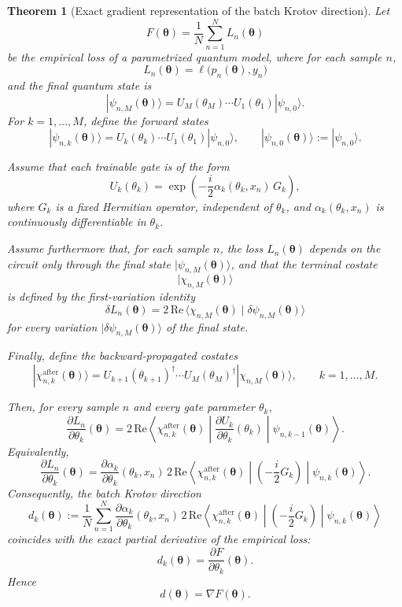 \documentclass[aps,prb,10pt,twocolumn,superscriptaddress]{revtex4-2}
\newtheorem{theorem}{Theorem}
\begin{document}
\begin{theorem}[Exact gradient representation of the batch Krotov direction]
\label{thm:exact_gradient_krotov_appendix}
Let
\[
F(\bm{\theta})=\frac{1}{N}\sum_{n=1}^N L_n(\bm{\theta})
\]
be the empirical loss of a parametrized quantum model, where for each sample \(n\),
\[
L_n(\bm{\theta})=\ell\bigl(p_n(\bm{\theta}),y_n\bigr)
\]
and the final quantum state is
\[
|\psi_{n,M}(\bm{\theta})\rangle
=
U_M(\theta_M)\cdots U_1(\theta_1)|\psi_{n,0}\rangle.
\]
For \(k=1,\dots,M\), define the forward states
\[
|\psi_{n,k}(\bm{\theta})\rangle
=
U_k(\theta_k)\cdots U_1(\theta_1)|\psi_{n,0}\rangle,
\qquad
|\psi_{n,0}(\bm{\theta})\rangle:=|\psi_{n,0}\rangle.
\]

Assume that each trainable gate is of the form
\[
U_k(\theta_k)=\exp\!\left(-\frac{i}{2}\alpha_k(\theta_k,x_n)\,G_k\right),
\]
where \(G_k\) is a fixed Hermitian operator, independent of \(\theta_k\), and
\(\alpha_k(\theta_k,x_n)\) is continuously differentiable in \(\theta_k\).

Assume furthermore that, for each sample \(n\), the loss \(L_n(\bm{\theta})\) depends on the
circuit only through the final state \( |\psi_{n,M}(\bm{\theta})\rangle \), and that the terminal costate
\[
|\chi_{n,M}(\bm{\theta})\rangle
\]
is defined by the first-variation identity
\[
\delta L_n(\bm{\theta})
=
2\,\mathrm{Re}\,\langle \chi_{n,M}(\bm{\theta})\mid \delta\psi_{n,M}(\bm{\theta})\rangle
\]
for every variation \(|\delta\psi_{n,M}(\bm{\theta})\rangle\) of the final state.

Finally, define the backward-propagated costates
\[
|\chi_{n,k}^{\mathrm{after}}(\bm{\theta})\rangle
=
U_{k+1}(\theta_{k+1})^\dagger\cdots U_M(\theta_M)^\dagger
|\chi_{n,M}(\bm{\theta})\rangle,
\qquad k=1,\dots,M.
\]

Then, for every sample \(n\) and every gate parameter \(\theta_k\),
\[
\frac{\partial L_n}{\partial \theta_k}(\bm{\theta})
=
2\,\mathrm{Re}\!\left\langle
\chi_{n,k}^{\mathrm{after}}(\bm{\theta})
\middle|
\frac{\partial U_k}{\partial \theta_k}(\theta_k)
\middle|
\psi_{n,k-1}(\bm{\theta})
\right\rangle.
\]
Equivalently,
\[
\frac{\partial L_n}{\partial \theta_k}(\bm{\theta})
=
\frac{\partial \alpha_k}{\partial \theta_k}(\theta_k,x_n)\,
2\,\mathrm{Re}\!\left\langle
\chi_{n,k}^{\mathrm{after}}(\bm{\theta})
\middle|
\left(-\frac{i}{2}G_k\right)
\middle|
\psi_{n,k}(\bm{\theta})
\right\rangle.
\]
Consequently, the batch Krotov direction
\[
d_k(\bm{\theta})
:=
\frac{1}{N}\sum_{n=1}^N
\frac{\partial \alpha_k}{\partial \theta_k}(\theta_k,x_n)\,
2\,\mathrm{Re}\!\left\langle
\chi_{n,k}^{\mathrm{after}}(\bm{\theta})
\middle|
\left(-\frac{i}{2}G_k\right)
\middle|
\psi_{n,k}(\bm{\theta})
\right\rangle
\]
coincides with the exact partial derivative of the empirical loss:
\[
d_k(\bm{\theta})=\frac{\partial F}{\partial \theta_k}(\bm{\theta}).
\]
Hence
\[
d(\bm{\theta})=\nabla F(\bm{\theta}).
\]
\end{theorem}
\end{document}
